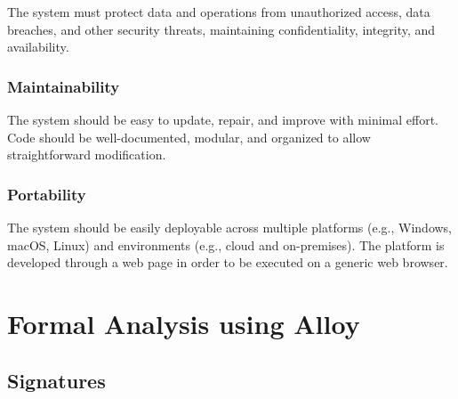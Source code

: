 \documentclass{article}
\begin{document}
The system must protect data and operations from unauthorized access, data breaches, and other security threats, maintaining confidentiality, integrity, and availability.

\subsubsection{Maintainability}

The system should be easy to update, repair, and improve with minimal effort. Code should be well-documented, modular, and organized to allow straightforward modification.

\subsubsection{Portability}

The system should be easily deployable across multiple platforms (e.g., Windows, macOS, Linux) and environments (e.g., cloud and on-premises). The platform is developed through a web page in order to be executed on a generic web browser.

\newpage
\section{Formal Analysis using Alloy}

\subsection{Signatures}
\end{document}

